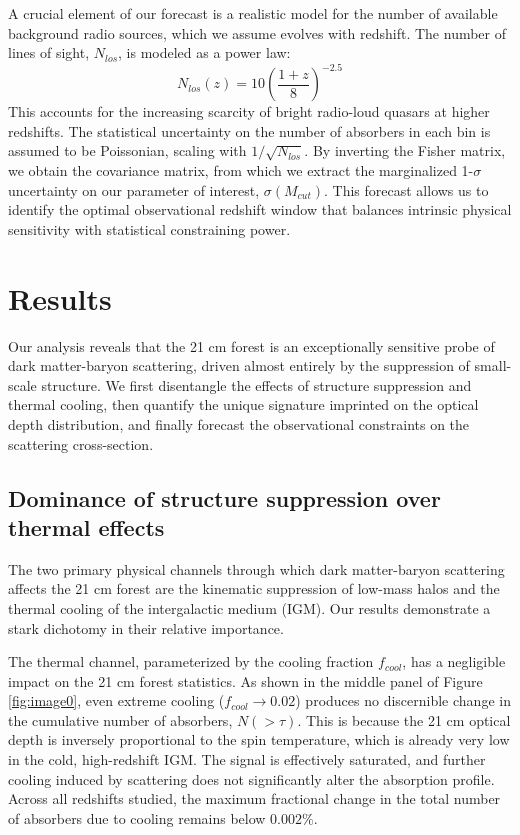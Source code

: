 \documentclass[]{article}
\begin{document}
A crucial element of our forecast is a realistic model for the number of available background radio sources, which we assume evolves with redshift. The number of lines of sight, $N_{los}$, is modeled as a power law:
\begin{equation}
N_{los}(z) = 10 \left( \frac{1+z}{8} \right)^{-2.5}
\end{equation}
This accounts for the increasing scarcity of bright radio-loud quasars at higher redshifts. The statistical uncertainty on the number of absorbers in each bin is assumed to be Poissonian, scaling with $1/\sqrt{N_{los}}$. By inverting the Fisher matrix, we obtain the covariance matrix, from which we extract the marginalized 1-$\sigma$ uncertainty on our parameter of interest, $\sigma(M_{cut})$. This forecast allows us to identify the optimal observational redshift window that balances intrinsic physical sensitivity with statistical constraining power.

\section{Results}
\label{sec:results}
Our analysis reveals that the 21 cm forest is an exceptionally sensitive probe of dark matter-baryon scattering, driven almost entirely by the suppression of small-scale structure. We first disentangle the effects of structure suppression and thermal cooling, then quantify the unique signature imprinted on the optical depth distribution, and finally forecast the observational constraints on the scattering cross-section.

\subsection{Dominance of structure suppression over thermal effects}

The two primary physical channels through which dark matter-baryon scattering affects the 21 cm forest are the kinematic suppression of low-mass halos and the thermal cooling of the intergalactic medium (IGM). Our results demonstrate a stark dichotomy in their relative importance.

The thermal channel, parameterized by the cooling fraction $f_{cool}$, has a negligible impact on the 21 cm forest statistics. As shown in the middle panel of Figure \ref{fig:image0}, even extreme cooling ($f_{cool} \to 0.02$) produces no discernible change in the cumulative number of absorbers, $N(>\tau)$. This is because the 21 cm optical depth is inversely proportional to the spin temperature, which is already very low in the cold, high-redshift IGM. The signal is effectively saturated, and further cooling induced by scattering does not significantly alter the absorption profile. Across all redshifts studied, the maximum fractional change in the total number of absorbers due to cooling remains below $0.002\%$.
\end{document}
